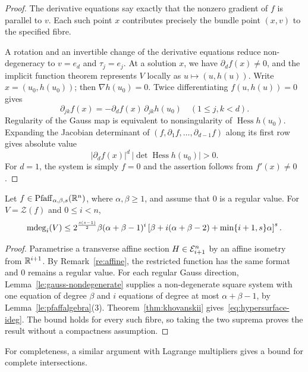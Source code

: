 \begin{proof}
The derivative equations say exactly that the nonzero gradient of $f$ is parallel to $v$. Each such point $x$ contributes precisely the bundle point $(x,v)$ to the specified fibre.

A rotation and an invertible change of the derivative equations reduce non-degeneracy to $v=e_d$ and $\tau_j=e_j$. At a solution $x$, we have $\partial_d f(x)\ne0$, and the implicit function theorem represents $V$ locally as $u\mapsto(u,h(u))$. Write $x=(u_0,h(u_0))$; then $\nabla h(u_0)=0$. Twice differentiating $f(u,h(u))=0$ gives
\[
\partial_{jk}f(x)=-\partial_d f(x)\,\partial_{jk}h(u_0)
\quad(1\le j,k<d).
\]
Regularity of the Gauss map is equivalent to nonsingularity of $\operatorname{Hess}h(u_0)$. Expanding the Jacobian determinant of $(f,\partial_1f,\dots,\partial_{d-1}f)$ along its first row gives absolute value
\[
|\partial_d f(x)|^d\,|\det\operatorname{Hess}h(u_0)|>0.
\]
For $d=1$, the system is simply $f=0$ and the assertion follows from $f'(x)\ne0$.
\end{proof}

\begin{proposition}\label{prop:hypersurface-degree}
Let $f\in\mathrm{Pfaff}_{\alpha,\beta,s}(\mathbb{R}^n)$, where $\alpha,\beta\ge1$, and assume that $0$ is a regular value. For $V=\mathcal Z(f)$ and $0\le i<n$,
\begin{equation}\label{eq:hypersurface-ideg}
\operatorname{\mathrm{mdeg}}_i(V)\le
2^{\frac{s(s-1)}2}\beta(\alpha+\beta-1)^i
\left[\beta+i(\alpha+\beta-2)+\min\{i+1,s\}\alpha\right]^s.
\end{equation}
\end{proposition}

\begin{proof}
Parametrise a transverse affine section $H\in\mathcal{E}_{i+1}^n$ by an affine isometry from $\mathbb{R}^{i+1}$. By Remark~\ref{re:affine}, the restricted function has the same format and $0$ remains a regular value. For each regular Gauss direction, Lemma~\ref{le:gauss-nondegenerate} supplies a non-degenerate square system with one equation of degree $\beta$ and $i$ equations of degree at most $\alpha+\beta-1$, by Lemma~\ref{le:pfaffalgebra}(3). Theorem~\ref{thm:khovanskii} gives~\eqref{eq:hypersurface-ideg}. The bound holds for every such fibre, so taking the two suprema proves the result without a compactness assumption.
\end{proof}

For completeness, a similar argument with Lagrange multipliers gives a bound for complete intersections.

